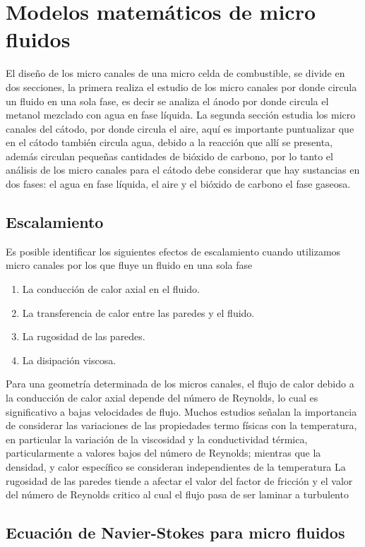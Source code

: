 \documentclass[12pt]{book}
\theoremstyle{definition}
\theoremstyle{remark}
\theoremstyle{plain}
\begin{document}
\chapter{Modelos matemáticos de micro fluidos}
El diseño de los micro canales de una micro celda de combustible, se divide en dos secciones, la
primera realiza el estudio de los micro canales por donde circula un fluido en una sola fase, es
decir se analiza el ánodo por donde circula el metanol mezclado con agua en fase líquida. La
segunda sección estudia los micro canales del cátodo, por donde circula el aire, aquí es importante
puntualizar que en el cátodo también circula agua, debido a la reacción que allí se presenta,
además circulan pequeñas cantidades de bióxido de carbono, por lo tanto el análisis de los micro
canales para el cátodo debe considerar que hay sustancias en dos fases: el agua en fase líquida,
el aire y el bióxido de carbono el fase gaseosa.

\section{Escalamiento}

Es posible identificar los siguientes efectos de escalamiento cuando utilizamos micro canales por
los que fluye un fluido en una sola fase

\begin{enumerate}
 \item La conducción de calor axial en el fluido.
 \item La transferencia de calor entre las paredes y el fluido.
 \item La rugosidad de las paredes.
 \item La disipación viscosa.
\end{enumerate}
Para una geometría determinada de los micros canales, el flujo de calor debido a la conducción de
calor axial depende del número de Reynolds, lo cual es significativo a bajas velocidades de flujo.
Muchos estudios señalan la importancia de considerar las variaciones de las propiedades termo
físicas con la temperatura, en particular la variación de la viscosidad y la conductividad térmica,
particularmente a valores bajos del número de Reynolds; mientras que la densidad, y calor
específico se consideran independientes de la temperatura
La rugosidad de las paredes tiende a afectar el valor del factor de fricción y el valor del número de
Reynolds critico al cual el flujo pasa de ser laminar a turbulento

\section{Ecuación de Navier-Stokes para micro fluidos}
\end{document}

